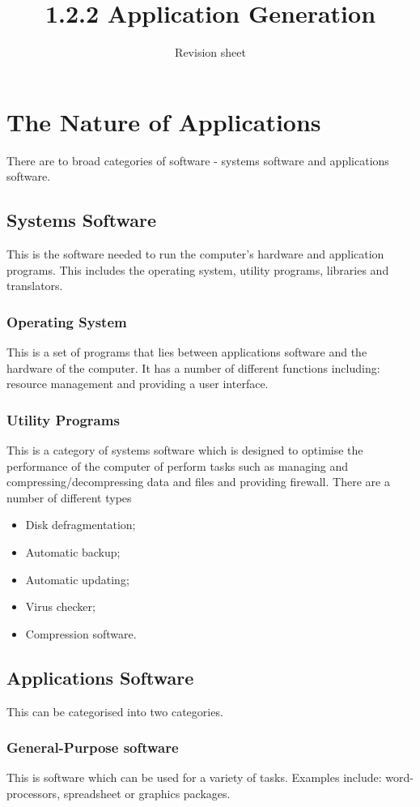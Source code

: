 \documentclass[a4paper,11pt, twocolumn]{article}
\title{1.2.2 Application Generation}
\author{Revision sheet}
\date{}
\begin{document}
\maketitle
\thispagestyle{fancy}

\section{The Nature of Applications}
There are to broad categories of software - systems software and applications software. 
\subsection{Systems Software}
This is the software needed to run the computer's hardware and application programs. This includes the operating system, utility programs, libraries and translators.
\subsubsection{Operating System}
This is a set of programs that lies between applications software and the hardware of the computer. It has a number of different functions including: resource management and providing a user interface.
\subsubsection{Utility Programs}
This is a category of systems software which is designed to optimise the performance of the computer of perform tasks such as managing and compressing/decompressing data and files and providing firewall. There are a number of different types
\begin{itemize}
    \item Disk defragmentation;
    \item Automatic backup;
    \item Automatic updating;
    \item Virus checker;
    \item Compression software.
\end{itemize}
\subsection{Applications Software}
This can be categorised into two categories.
\subsubsection{General-Purpose software}
This is software which can be used for a variety of tasks. Examples include: word-processors, spreadsheet or graphics packages. 
\end{document}
